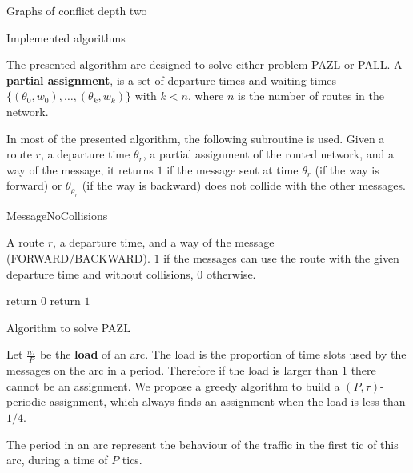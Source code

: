 \documentclass[10pt]{article}
\begin{document}
\begin{section}{Graphs of conflict depth two}
  \begin{subsection}{Implemented algorithms}
  
 

  The presented algorithm are designed to solve either problem PAZL or PALL.
  A \textbf{partial assignment}, is a set of departure times and waiting times $\{(\theta_0,w_0),\ldots,(\theta_k,w_k)\}$ with $k<n$, where $n$ is the number of routes in the network.
  
   
   
  In most of the presented algorithm, the following subroutine is used. Given a route $r$, a departure time $\theta_r$, a partial assignment of the routed network, and a way of the message, it returns $1$ if the message sent at time $\theta_r$ (if the way is forward) or $\theta_{\rho_r}$ (if the way is backward)  does not collide with the other messages. 
   	\begin{algorithm}[H]
 	\caption{MessageNoCollisions}
	\label{algo:messagenocollisions}
 	\begin{algorithmic}
 	\REQUIRE A route $r$, a departure time, and a way of the message (FORWARD/BACKWARD).
	\ENSURE $1$ if the messages can use the route with the given departure time and without collisions, $0$ otherwise.

 	\STATE return $0$
 	\ENDIF
 	\ENDFOR
	\STATE return $1$
 	\end{algorithmic}
 	\end{algorithm}
 	
  \begin{subsubsection}{Algorithm to solve PAZL }

 Let $\frac{n\tau}{P}$ be the \textbf{load} of an arc. The load is the proportion of time slots used by the messages on the arc in a period. Therefore if the load is larger than $1$ there cannot be an assignment. We propose a greedy algorithm to build a $(P,\tau)$-periodic assignment, which always finds an assignment when the load is less than $1/4$.
 
 
 
 The period in an arc represent the behaviour of the traffic in the first tic of this arc, during a time of $P$ tics.
    

\end{subsubsection}
\end{subsection}
\end{section}
\end{document}
